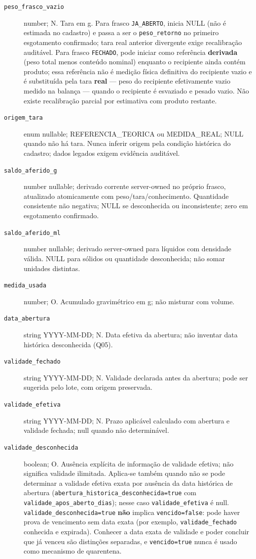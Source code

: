 \begin{description}
\item[\texttt{peso\_frasco\_vazio}] number; N. Tara em g. Para frasco \texttt{JA\_ABERTO}, inicia NULL (não é estimada no cadastro) e passa a ser o \texttt{peso\_retorno} no primeiro esgotamento confirmado; tara real anterior divergente exige recalibração auditável. Para frasco \texttt{FECHADO}, pode iniciar como referência \textbf{derivada} (peso total menos conteúdo nominal) enquanto o recipiente ainda contém produto; essa referência não é medição física definitiva do recipiente vazio e é substituída pela tara \textbf{real} --- peso do recipiente efetivamente vazio medido na balança --- quando o recipiente é esvaziado e pesado vazio. Não existe recalibração parcial por estimativa com produto restante.
\item[\texttt{origem\_tara}] enum nullable; REFERENCIA\_TEORICA ou MEDIDA\_REAL; NULL quando não há tara. Nunca inferir origem pela condição histórica do cadastro; dados legados exigem evidência auditável.
\item[\texttt{saldo\_aferido\_g}] number nullable; derivado corrente server-owned no próprio frasco, atualizado atomicamente com peso/tara/conhecimento. Quantidade consistente não negativa; NULL se desconhecida ou inconsistente; zero em esgotamento confirmado.
\item[\texttt{saldo\_aferido\_ml}] number nullable; derivado server-owned para líquidos com densidade válida. NULL para sólidos ou quantidade desconhecida; não somar unidades distintas.
\item[\texttt{medida\_usada}] number; O. Acumulado gravimétrico em g; não misturar com volume.
\item[\texttt{data\_abertura}] string YYYY-MM-DD; N. Data efetiva da abertura; não inventar data histórica desconhecida (Q05).
\item[\texttt{validade\_fechado}] string YYYY-MM-DD; N. Validade declarada antes da abertura; pode ser sugerida pelo lote, com origem preservada.
\item[\texttt{validade\_efetiva}] string YYYY-MM-DD; N. Prazo aplicável calculado com abertura e validade fechada; null quando não determinável.
\item[\texttt{validade\_desconhecida}] boolean; O. Ausência explícita de informação de validade efetiva; não significa validade ilimitada. Aplica-se também quando não se pode determinar a validade efetiva exata por ausência da data histórica de abertura (\texttt{abertura\_historica\_desconhecida=true} com \texttt{validade\_apos\_aberto\_dias}); nesse caso \texttt{validade\_efetiva} é null. \texttt{validade\_desconhecida=true} \textbf{não} implica \texttt{vencido=false}: pode haver prova de vencimento sem data exata (por exemplo, \texttt{validade\_fechado} conhecida e expirada). Conhecer a data exata de validade e poder concluir que já venceu são distinções separadas, e \texttt{vencido=true} nunca é usado como mecanismo de quarentena.

\end{description}
